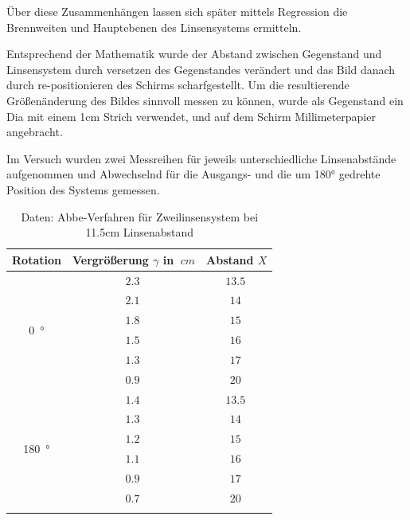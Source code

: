 Über diese Zusammenhängen lassen sich später mittels Regression die Brennweiten und Hauptebenen des Linsensystems ermitteln.

Entsprechend der Mathematik wurde der Abstand zwischen Gegenstand und Linsensystem durch versetzen des Gegenstandes verändert und das Bild danach durch re-positionieren des Schirms scharfgestellt.
Um die resultierende Größenänderung des Bildes sinnvoll messen zu können, wurde als Gegenstand ein Dia mit einem 1cm Strich verwendet, und auf dem Schirm Millimeterpapier angebracht.

Im Versuch wurden zwei Messreihen für jeweils unterschiedliche Linsenabstände aufgenommen und Abwechselnd für die Ausgangs- und die um 180° gedrehte Position des Systems gemessen.

\begin{table}[h!]
    \begin{center}
        \caption{Daten: Abbe-Verfahren für Zweilinsensystem bei 11.5cm Linsenabstand}
        \begin{tabular}{ccc}
            \hline
            Rotation   &  Vergrößerung  $\gamma$ in $\SI{}{cm}$    & Abstand $X$ \\
            \hline
            \multirow{6}{*}{\SI{0}{\degree}}    & $\SI{2.3}{}$ & $\SI{13.5}{}$ \\
                                                & $\SI{2.1}{}$ & $\SI{14}{}$ \\
                                                & $\SI{1.8}{}$ & $\SI{15}{}$ \\
                                                & $\SI{1.5}{}$ & $\SI{16}{}$ \\
                                                & $\SI{1.3}{}$ & $\SI{17}{}$ \\
                                                & $\SI{0.9}{}$ & $\SI{20}{}$ \\
            \hline
            \multirow{6}{*}{\SI{180}{\degree}}  & $\SI{1.4}{}$ & $\SI{13.5}{}$ \\
                                                & $\SI{1.3}{}$ & $\SI{14}{}$ \\
                                                & $\SI{1.2}{}$ & $\SI{15}{}$ \\
                                                & $\SI{1.1}{}$ & $\SI{16}{}$ \\
                                                & $\SI{0.9}{}$ & $\SI{17}{}$ \\
                                                & $\SI{0.7}{}$ & $\SI{20}{}$ \\
            \hline
            \label{tab:Abbe1}
        \end{tabular}
    \end{center}
\end{table}

